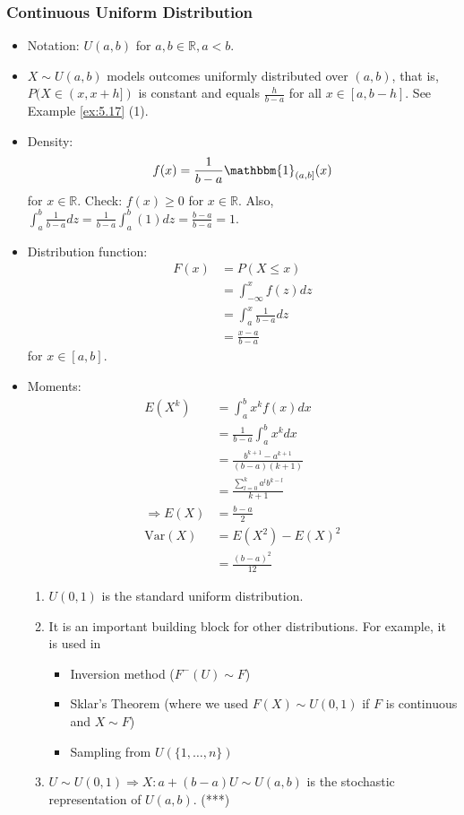 \documentclass{article}
\newcommand{\R}{\mathbb{R}}
\newcommand{\Var}{\mathrm{Var}}
\begin{document}
		\subsubsection{Continuous Uniform Distribution}
		\begin{itemize}
			\item Notation: $U(a, b)$ for $a, b\in\R, a<b$.
			\item $X\sim U(a, b)$ models outcomes uniformly distributed over $(a, b)$, that is, $P(X\in(x, x+h])$ is constant and equals $\frac{h}{b-a}$ for all $x\in[a, b-h]$. See Example \ref{ex:5.17} (1).
			\item Density: \[f(x)=\frac{1}{b-a}\mathbbm{1}_{(a, b]}(x)\] for $x\in\R$.
			Check: $f(x)\geq0$ for $x\in\R$. Also, $\int_a^b\frac{1}{b-a}dz=\frac{1}{b-a}\int_a^b(1)dz=\frac{b-a}{b-a}=1$.
			\item Distribution function:
					\begin{align*}
						F(x)&=P(X\leq x)\\
						&=\int_{-\infty}^xf(z)dz\\
						&=\int_a^x\frac{1}{b-a}dz\\
						&=\frac{x-a}{b-a}
					\end{align*}
					for $x\in[a, b]$.
			\item Moments:
					\begin{align*}
						E(X^k)&=\int_a^bx^kf(x)dx\\
						&=\frac{1}{b-a}\int_a^bx^kdx\\
						&=\frac{b^{k+1}-a^{k+1}}{(b-a)(k+1)}\\
						&=\frac{\sum_{l=0}^{k}a^lb^{k-l}}{k+1}\\
						\Rightarrow E(X)&=\frac{b-a}{2}\\
						\Var(X)&=E(X^2)-E(X)^2\\
						&=\frac{(b-a)^2}{12}
					\end{align*}
			\begin{myrem*}{}{}
				\begin{enumerate}
					\item $U(0, 1)$ is the standard uniform distribution.
					
					\item It is an important building block for other distributions. For example, it is used in
					\begin{itemize}
						\item Inversion method ($F^-(U)\sim F$)
						\item Sklar's Theorem (where we used $F(X)\sim U(0, 1)$ if $F$ is continuous and $X\sim F$)
						\item Sampling from $U(\{1, \dots, n\})$
					\end{itemize}
					
					\item $U\sim U(0, 1)\Rightarrow X : a+(b-a)U\sim U(a, b)$ is the stochastic representation of $U(a, b)$. (***)
				\end{enumerate}
			\end{myrem*}
		\end{itemize}
		
\end{document}
